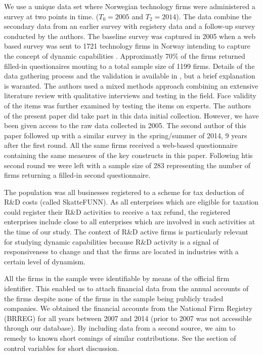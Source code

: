 \documentclass[review,fleqn]{elsarticle}\usepackage[]{graphicx}\usepackage[]{color}
\begin{document}
We use a unique data set where Norwegian technology firms were administered a survey at
two points in time. ($T_0 = 2005$ and $T_2 = 2014$). The data combine the secondary data
from an earlier survey with registery data and a follow-up survey conducted by the
authors. The baseline survey was captured in 2005 when a web based survey was sent to 1721
technology firms in Norway intending to capture the concept of dynamic capabilities
\citep{Alsos2007}. Approximatly 70\% of the firms returned filled-in questionaires mouting
to a total sample size of 1199 firms. Details of the data gathering process and the
validation is available in \cite{Alsos2007}, but a brief explanation is waranted. The
authors used a mixed methods approach combining an extensive literature review with
qualitative interviews and testing in the field. Face validity of the items was further
examined by testing the items on experts. The authors of the present paper did take part
in this data initial collection. However, we have been given access to the raw data
collected in 2005. The second author of this paper followed up with a similar survey in
the spring/summer of 2014, 9 years after the first round. All the same firms received a
web-based questionnaire containing the same measures of the key constructs in this
paper. Following htis second round we were left with a sample size of 283 representing the
number of firms returning a filled-in second questionnaire.

The population was all businesses registered to a scheme for
tax deduction of R\&D costs (called SkatteFUNN). As all enterprises which are eligible for
taxation could register their R\&D activities to receive a tax refund, the registered
enterprises include close to all enterprises which are involved in such activities at the
time of our study. The context of R\&D active firms is particularly relevant for studying
dynamic capabilities because R\&D activity is a signal of responsiveness to change and
that the firms are located in industries with a certain level of dynamism.

All the firms in the sample were identifiable by means of the official firm
identifier. This enabled us to attach financial data from the annual accounts of the firms
despite none of the firms in the sample being publicly traded companies. We obtained the
financial accounts from the National Firm Registry (BRREG) for all years between 2007 and
2014 (prior to 2007 was not accessible through our database). By including data from a
second source, we aim to remedy to known short comings of similar
contributions. See the section of control variables for short
discussion.
\end{document}

